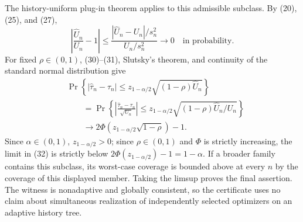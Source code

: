 The history-uniform plug-in theorem applies to this admissible subclass. By (20), (25), and (27),
\[
\left|\frac{\widehat U_n}{U_n}-1\right|
\le\frac{|\widehat U_n-U_n|/s_n^2}{U_n/s_n^2}
\longrightarrow0
\quad\text{in probability}.
\tag{31}
\]
For fixed \(\rho\in(0,1)\), (30)--(31), Slutsky's theorem, and continuity of the standard normal distribution give
\[
\begin{aligned}
&\Pr\!\left\{|\widehat\tau_n-\tau_n|
\le z_{1-\alpha/2}\sqrt{(1-\rho)\widehat U_n}\right\}\\
&\qquad=\Pr\!\left\{
\left|\frac{\widehat\tau_n-\tau_n}{\sqrt{U_n}}\right|
\le z_{1-\alpha/2}\sqrt{(1-\rho)\widehat U_n/U_n}\right\}\\
&\qquad\longrightarrow
2\Phi\!\left(z_{1-\alpha/2}\sqrt{1-\rho}\right)-1.
\end{aligned}
\tag{32}
\]
Since \(\alpha\in(0,1)\), \(z_{1-\alpha/2}>0\); since \(\rho\in(0,1)\) and \(\Phi\) is strictly increasing, the limit in (32) is strictly below \(2\Phi(z_{1-\alpha/2})-1=1-\alpha\). If a broader family contains this subclass, its worst-case coverage is bounded above at every \(n\) by the coverage of this displayed member. Taking the limsup proves the final assertion. The witness is nonadaptive and globally consistent, so the certificate uses no claim about simultaneous realization of independently selected optimizers on an adaptive history tree.